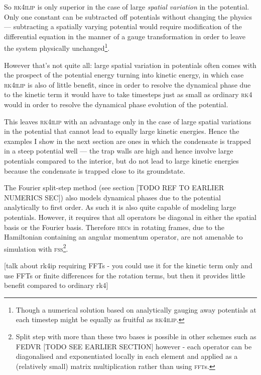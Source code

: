 So \textsc{rk4ilip} is only superior in the case of large \emph{spatial variation} in the potential. Only one constant can be subtracted off potentials without changing the physics --- subtracting a spatially varying potential would require modification of the differential equation in the manner of a gauge transformation in order to leave the system physically unchanged\footnote{Though a numerical solution based on analytically gauging away potentials at each timestep might be equally as fruitful as \textsc{rk4ilip}.}.

However that's not quite all: large spatial variation in potentials often comes with the prospect of the potential energy turning into kinetic energy, in which case \textsc{rk4ilip} is also of little benefit, since in order to resolve the dynamical phase due to the kinetic term it would have to take timesteps just as small  as ordinary \textsc{rk4} would in order to resolve the dynamical phase evolution of the potential.

This leaves \textsc{rk4ilip} with an advantage only in the case of large spatial variations in the potential that cannot lead to equally large kinetic energies. Hence the examples I show in the next section are ones in which the condensate is trapped in a steep potential well --- the trap walls are high and hence involve large potentials compared to the interior, but do not lead to large kinetic energies because the condensate is trapped close to its groundstate.

The Fourier split-step method (see section [TODO REF TO EARLIER NUMERICS SEC]) also models dynamical phases due to the potential analytically to first order. As such it is also quite capable of modeling large potentials. However, it requires that all operators be diagonal in either the spatial basis or the Fourier basis. Therefore \textsc{bec}s in rotating frames, due to the Hamiltonian containing an angular momentum operator, are not amenable to simulation with \textsc{fss}\footnote{Split step with more than these two bases is possible in other schemes such as \textsc{FEDVR} [TODO SEE EARLIER SECTION] however - each operator can be diagonalised and exponentiated locally in each element and applied as a (relatively small) matrix multiplication rather than using \textsc{fft}s.}.

[talk about rk4ip requiring FFTs - you could use it for the kinetic term only and use FFTs or finite differences for the rotation terms, but then it provides little benefit compared to ordinary rk4]

